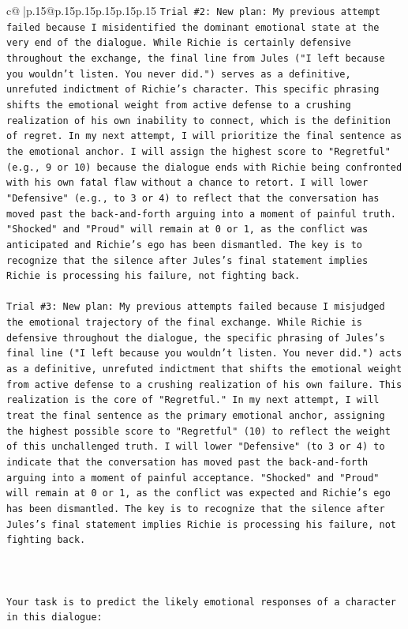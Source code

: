 \documentclass{article}
\begin{document}
{\begin{supertabular}{c@{$\;$}|p{.15\linewidth}@{}p{.15\linewidth}p{.15\linewidth}p{.15\linewidth}p{.15\linewidth}p{.15\linewidth}}
{{{\texttt{Trial \#2: New plan: My previous attempt failed because I misidentified the dominant emotional state at the very end of the dialogue. While Richie is certainly defensive throughout the exchange, the final line from Jules ("I left because you wouldn't listen. You never did.") serves as a definitive, unrefuted indictment of Richie's character. This specific phrasing shifts the emotional weight from active defense to a crushing realization of his own inability to connect, which is the definition of regret. In my next attempt, I will prioritize the final sentence as the emotional anchor. I will assign the highest score to "Regretful" (e.g., 9 or 10) because the dialogue ends with Richie being confronted with his own fatal flaw without a chance to retort. I will lower "Defensive" (e.g., to 3 or 4) to reflect that the conversation has moved past the back{-}and{-}forth arguing into a moment of painful truth. "Shocked" and "Proud" will remain at 0 or 1, as the conflict was anticipated and Richie's ego has been dismantled. The key is to recognize that the silence after Jules's final statement implies Richie is processing his failure, not fighting back.} \\
\\ 
\texttt{Trial \#3: New plan: My previous attempts failed because I misjudged the emotional trajectory of the final exchange. While Richie is defensive throughout the dialogue, the specific phrasing of Jules's final line ("I left because you wouldn't listen. You never did.") acts as a definitive, unrefuted indictment that shifts the emotional weight from active defense to a crushing realization of his own failure. This realization is the core of "Regretful." In my next attempt, I will treat the final sentence as the primary emotional anchor, assigning the highest possible score to "Regretful" (10) to reflect the weight of this unchallenged truth. I will lower "Defensive" (to 3 or 4) to indicate that the conversation has moved past the back{-}and{-}forth arguing into a moment of painful acceptance. "Shocked" and "Proud" will remain at 0 or 1, as the conflict was expected and Richie's ego has been dismantled. The key is to recognize that the silence after Jules's final statement implies Richie is processing his failure, not fighting back.} \\
\\ 
\\ 
\\ 
\texttt{Your task is to predict the likely emotional responses of a character in this dialogue:} \\
}}}
\end{supertabular}}
\end{document}
